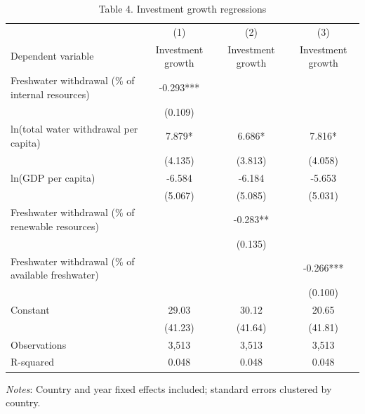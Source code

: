 \begin{table}[htbp]
\centering
\caption{Table 4. Investment growth regressions}
\small
\begin{tabular}{lccc}
\hline
 & (1) & (2) & (3) \\
Dependent variable & Investment growth & Investment growth & Investment growth \\
\hline
Freshwater withdrawal (\% of internal resources) & -0.293*** &  &  \\
 & (0.109) &  &  \\
ln(total water withdrawal per capita) & 7.879* & 6.686* & 7.816* \\
 & (4.135) & (3.813) & (4.058) \\
ln(GDP per capita) & -6.584 & -6.184 & -5.653 \\
 & (5.067) & (5.085) & (5.031) \\
Freshwater withdrawal (\% of renewable resources) &  & -0.283** &  \\
 &  & (0.135) &  \\
Freshwater withdrawal (\% of available freshwater) &  &  & -0.266*** \\
 &  &  & (0.100) \\
Constant & 29.03 & 30.12 & 20.65 \\
 & (41.23) & (41.64) & (41.81) \\
\hline
Observations & 3,513 & 3,513 & 3,513 \\
R-squared & 0.048 & 0.048 & 0.048 \\
\hline
\end{tabular}
\vspace{0.5em}
\parbox{0.95\textwidth}{\footnotesize \textit{Notes}: Country and year fixed effects included; standard errors clustered by country.}
\end{table}
